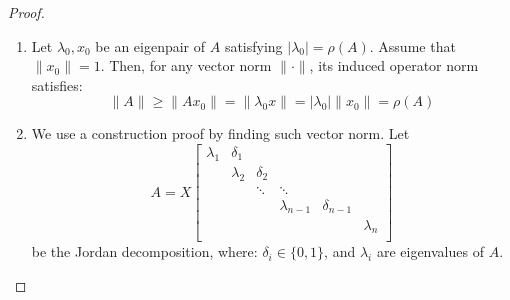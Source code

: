 \documentclass[../main/main.tex]{subfiles}
\begin{document}
\begin{proof}
  \begin{enumerate}
    \item Let $\lambda_{0},x_{0}$ be an eigenpair of $A$ satisfying $|\lambda_{0}| = \rho(A)$. Assume that $\|x_0\|=1$. Then, for any vector norm $\|\cdot\|$, its induced operator norm satisfies: \[
          \|A\|\geq \|Ax_{0}\| = \|\lambda_{0}x\| = |\lambda_{0}| \|x_{0}\| = \rho(A)
          \]
    \item We use a construction proof by finding such vector norm. Let \[
A = X \begin{bmatrix}
      \lambda_{1}& \delta_{1}&&& &\\
      & \lambda_{2} & \delta_{2}&&& \\
      & & \ddots & \ddots &&\\
      & &  & \lambda_{n-1} &\delta_{n-1}&\\
      &&&&& \lambda_{n}  \\
    \end{bmatrix}
          \] be the Jordan decomposition, where: $\delta_{i} \in \{ 0,1\}$, and $\lambda_{i}$ are eigenvalues of $A$.


\end{enumerate}
\end{proof}
\end{document}
